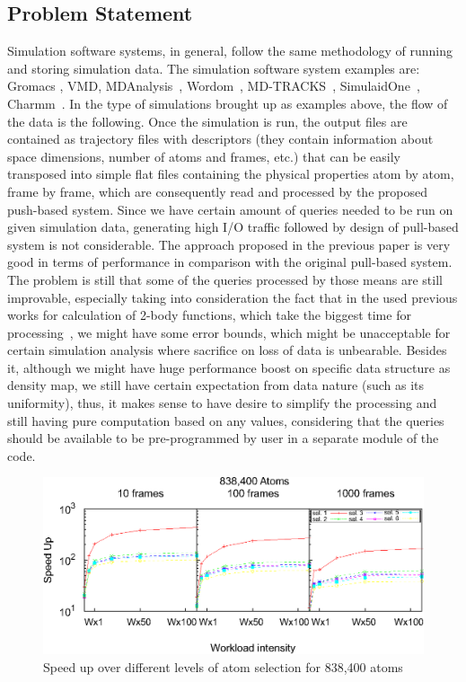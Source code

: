 \documentclass[10pt,journal,final,letterpaper,twocolumn]{IEEEtran}
\begin{document}
\subsection{Problem Statement}
Simulation software systems, in general, follow the same methodology of running and storing simulation data. The simulation software system examples are: Gromacs \cite{GROMACS4}, VMD\cite{VMD}, MDAnalysis~\cite{MDAnalysis}, Wordom~\cite{wordom}, MD-TRACKS~\cite{MDtracks}, SimulaidOne~\cite{Simulaid}, Charmm~\cite{CHARMM}. In the type of simulations brought up as examples above, the flow of the data is the following. Once the simulation is run, the output files are contained as trajectory files with descriptors (they contain information about space dimensions, number of atoms and frames, etc.) that can be easily transposed into simple flat files containing the physical properties atom by atom, frame by frame, which are consequently read and processed by the proposed push-based system. Since we have certain amount of queries needed to be run on given simulation data, generating high I/O traffic followed by design of pull-based system is not considerable. The approach proposed in the previous paper is very good in terms of performance in comparison with the original pull-based system\cite{mainPaper}. The problem is still that some of the queries processed by those means are still improvable, especially taking into consideration the fact that in the used previous works for calculation of 2-body functions, which take the biggest time for processing~\cite{ytu:icde09, EDBT12}, we might have some error bounds, which might be unacceptable for certain simulation analysis where sacrifice on loss of data is unbearable. Besides it, although we might have huge performance boost on specific data structure as density map, we still have certain expectation from data nature (such as its uniformity), thus, it makes sense to have desire to simplify the processing and still having pure computation based on any values, considering that the queries should be available to be pre-programmed by user in a separate module of the code.


\begin{figure}
 \centerline{ \includegraphics[width=1\columnwidth]{images/speedup838K-pomalo-za-4.eps} }
 \caption{ Speed up over different levels of atom selection for 838,400 atoms \cite{mainPaper}}
 \label{fg:sample_estimation_old_paper}
\end{figure}
\end{document}
